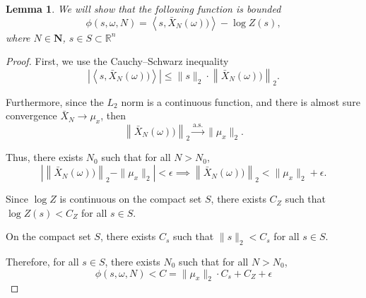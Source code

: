 \documentclass{article}
\theoremstyle{plain}
\newtheorem{lemma}[theorem]{Lemma}
\theoremstyle{definition}
\theoremstyle{remark}
\begin{document}
\begin{lemma} 
We will show that the following function is bounded
\begin{equation}
    \phi(s, \omega, N) = \left\langle s, \bar{X}_N(\omega)) \right\rangle - \log Z(s),
\end{equation}
where $ N \in \mathbf{N} $, $ s \in S \subset \mathbb{R}^n $ \end{lemma}
\begin{proof}
First, we use the Cauchy–Schwarz inequality
\begin{equation}
    \left| \left\langle s, \bar{X}_N(\omega)) \right\rangle \right| \leq \|s\|_2 \cdot \left\| \bar{X}_N(\omega)) \right\|_2.
\end{equation}

Furthermore, since the $L_{2}$ norm is a continuous function, and there is almost sure convergence $\bar{X}_N \rightarrow \mu_x$, then
\begin{equation}
    \left\| \bar{X}_N(\omega)) \right\|_2 \xrightarrow{\text{a.s.}} \|\mu_x\|_2.
\end{equation}

Thus, there exists $ N_0 $ such that for all $ N > N_0 $,
\begin{equation}
    \left| \left\| \bar{X}_N(\omega)) \right\|_2 - \|\mu_x\|_2 \right| < \epsilon \implies \left\| \bar{X}_N(\omega)) \right\|_2 < \|\mu_x\|_2 + \epsilon.
\end{equation}

Since $ \log Z $ is continuous on the compact set $ S $, there exists $ C_Z $ such that $ \log Z(s) < C_Z $ for all $ s \in S $.

On the compact set $ S $, there exists $ C_s $ such that $ \|s\|_2 < C_s $ for all $ s \in S $.

Therefore, for all $ s \in S $, there exists $ N_0 $ such that for all $ N > N_0 $,
\begin{equation}
    \phi(s, \omega, N) < C = \|\mu_x\|_2 \cdot C_s + C_Z + \epsilon
\end{equation}
\end{proof}
\end{document}
